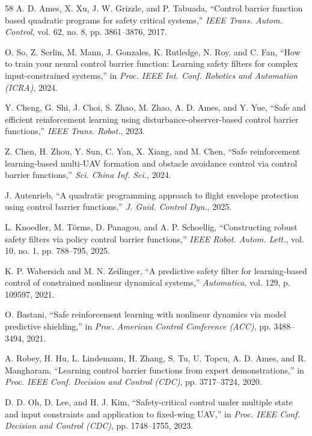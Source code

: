 \documentclass[conference]{IEEEtran}
\begin{document}
\begin{thebibliography}{58}
A. D. Ames, X. Xu, J. W. Grizzle, and P. Tabuada,
``Control barrier function based quadratic programs for safety critical systems,''
\emph{IEEE Trans. Autom. Control}, vol. 62, no. 8, pp. 3861--3876, 2017.

O. So, Z. Serlin, M. Mann, J. Gonzales, K. Rutledge, N. Roy, and C. Fan,
``How to train your neural control barrier function: Learning safety filters for complex input-constrained systems,''
in \emph{Proc. IEEE Int. Conf. Robotics and Automation (ICRA)}, 2024.

Y. Cheng, G. Shi, J. Choi, S. Zhao, M. Zhao, A. D. Ames, and Y. Yue,
``Safe and efficient reinforcement learning using disturbance-observer-based control barrier functions,''
\emph{IEEE Trans. Robot.}, 2023.

Z. Chen, H. Zhou, Y. Sun, C. Yan, X. Xiang, and M. Chen,
``Safe reinforcement learning-based multi-UAV formation and obstacle avoidance control via control barrier functions,''
\emph{Sci. China Inf. Sci.}, 2024.

J. Autenrieb,
``A quadratic programming approach to flight envelope protection using control barrier functions,''
\emph{J. Guid. Control Dyn.}, 2025.

L. Knoedler, M. T{\"o}rms, D. Panagou, and A. P. Schoellig,
``Constructing robust safety filters via policy control barrier functions,''
\emph{IEEE Robot. Autom. Lett.}, vol. 10, no. 1, pp. 788--795, 2025.

K. P. Wabersich and M. N. Zeilinger,
``A predictive safety filter for learning-based control of constrained nonlinear dynamical systems,''
\emph{Automatica}, vol. 129, p. 109597, 2021.

O. Bastani,
``Safe reinforcement learning with nonlinear dynamics via model predictive shielding,''
in \emph{Proc. American Control Conference (ACC)}, pp. 3488--3494, 2021.

A. Robey, H. Hu, L. Lindemann, H. Zhang, S. Tu, U. Topcu, A. D. Ames, and R. Mangharam,
``Learning control barrier functions from expert demonstrations,''
in \emph{Proc. IEEE Conf. Decision and Control (CDC)}, pp. 3717--3724, 2020.

D. D. Oh, D. Lee, and H. J. Kim,
``Safety-critical control under multiple state and input constraints and application to fixed-wing UAV,''
in \emph{Proc. IEEE Conf. Decision and Control (CDC)}, pp. 1748--1755, 2023.


\end{thebibliography}
\end{document}
